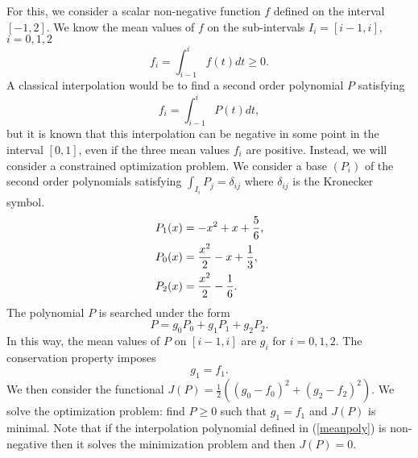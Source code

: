 \documentclass{fldauth}
\theoremstyle{plain}
\theoremstyle{plain}
\theoremstyle{plain}
\theoremstyle{plain}
\theoremstyle{plain}
\theoremstyle{plain}
\begin{document}
For this, we consider a scalar non-negative function $f$ defined
on the interval $[-1,2]$. We know the mean values of $f$ on the
sub-intervals $I_i=[i-1,i]$, $i=0,1,2$
\begin{equation}\label{subcell}
    f_i=
\int_{i - 1}^i {f(t)dt \ge 0.}
\end{equation}
A classical interpolation would be to find a second order
polynomial $P$ satisfying
\begin{equation}\label{meanpoly}
    f_i=
\int_{i - 1}^i {P(t)dt,}
\end{equation}
but it is known that this interpolation can be negative in some
point in the interval $[0,1]$, even if the three mean values $f_i$
are positive. Instead, we will consider a constrained optimization
problem. We consider a base $(P_i)$ of the second order
polynomials satisfying $ \int_{I_i } {P_j }  = \delta _{ij}$ where
$\delta _{ij}$ is the Kronecker symbol.
\begin{equation}\label{base}
\begin{gathered}
  P_1 (x) =  - x^2  + x + \frac{5}
{6}, \hfill \\
  P_0 (x) = \frac{{x^2 }}
{2} - x + \frac{1}
{3}, \hfill \\
  P_2 (x) = \frac{{x^2 }}
{2} - \frac{1}
{6}. \hfill \\
\end{gathered}
\end{equation}
The polynomial $P$ is searched under the form
\begin{equation}\label{poly}
P = g_0 P_0  + g_1 P_1  + g_2 P_2 .
\end{equation}
In this way, the mean values of $P$ on $[i-1,i]$ are $g_i$ for
$i=0,1,2$. The conservation property imposes
\begin{equation}\label{consf}
    g_1=f_1.
\end{equation}
We then consider the functional $ J(P) = \frac{1} {2}\left( {(g_0
- f_0 )^2  + (g_2  - f_2 )^2 } \right)$. We solve the optimization
problem: find $P\geq 0$ such that $g_1=f_1$ and $J(P)$ is minimal.
Note that if the interpolation polynomial defined in
(\ref{meanpoly}) is non-negative then it solves the minimization
problem and then $J(P)=0$.
\end{document}
